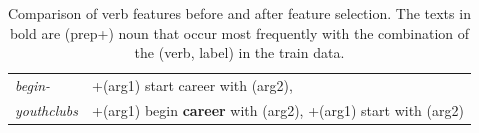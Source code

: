 \begin{table}[t]
\begin{scriptsize}
\begin{center}
\begin{tabular}{|l|l|}
\hline
\textit{begin-} &+(arg1) start career with (arg2), \\
\textit{youthclubs}& +(arg1) begin \textbf{career} with (arg2), +(arg1) start with (arg2) \\
\hline
\end{tabular}
\caption{\label{table:verbs} Comparison of verb features before and after feature selection. The texts in bold are (prep+) noun that occur most frequently with the combination of the (verb, label) in the train data.}
\end{center}
\end{scriptsize}
\end{table}
\normalsize
